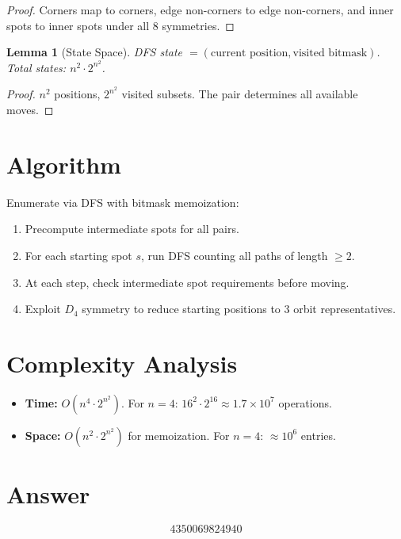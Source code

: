 \documentclass[11pt]{article}
\newtheorem{lemma}[theorem]{Lemma}
\begin{document}
\begin{proof}
Corners map to corners, edge non-corners to edge non-corners, and inner spots to inner spots under all 8 symmetries.
\end{proof}

\begin{lemma}[State Space]
DFS state $= (\text{current position}, \text{visited bitmask})$. Total states: $n^2 \cdot 2^{n^2}$.
\end{lemma}

\begin{proof}
$n^2$ positions, $2^{n^2}$ visited subsets. The pair determines all available moves.
\end{proof}

\section{Algorithm}

Enumerate via DFS with bitmask memoization:
\begin{enumerate}
\item Precompute intermediate spots for all pairs.
\item For each starting spot $s$, run DFS counting all paths of length $\ge 2$.
\item At each step, check intermediate spot requirements before moving.
\item Exploit $D_4$ symmetry to reduce starting positions to 3 orbit representatives.
\end{enumerate}

\section{Complexity Analysis}

\begin{itemize}
\item \textbf{Time:} $O(n^4 \cdot 2^{n^2})$. For $n=4$: $16^2 \cdot 2^{16} \approx 1.7 \times 10^7$ operations.
\item \textbf{Space:} $O(n^2 \cdot 2^{n^2})$ for memoization. For $n=4$: $\approx 10^6$ entries.
\end{itemize}

\section{Answer}

\[
\boxed{4350069824940}
\]
\end{document}
